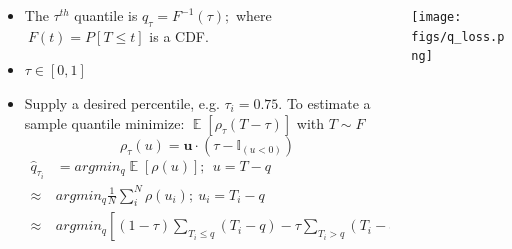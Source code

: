\documentclass[t, pdftex]{beamer}
\DeclareMathOperator*{\E}{\mathbb{E}}
\begin{document}
\begin{frame}
{\begin{columns}
\begin{column}{0.5\textwidth}
{\begin{itemize}
                    \item The $\tau^{th}$ quantile is $q_\tau = F^{-1}(\tau); $ where $\ F(t)=P[T \leq t]$ is a CDF.
                    \item $\tau \in [0, 1]$
                    \item Supply a desired percentile, e.g. $\tau_i = 0.75$.
                    To estimate a sample quantile minimize: $\E[\rho_\tau(T - \tau)]$ with $T \sim F$
                    \[
                    \rho_\tau( u) = \mathbf u \cdot (\tau - \mathbb{I}_{( u < 0)})
                    \]
                    \begin{equation}
                    \left.\begin{aligned}
                    \hat q_{\tau_i} &= argmin_{q} \E[\rho(u)];\ \  u = T - q  \\
                    \approx & argmin_q  \frac{1}{N} \sum_i^N \rho(u_i); \ u_i = T_i - q \\
                    \approx & argmin_q \left[ (1-\tau) \sum_{T_i \leq q}( T_i - q ) - \tau \sum_{T_i > q} (T_i - q) \right]
                    \end{aligned}\right. \nonumber
                    \end{equation}
                \end{itemize}
            }
        \end{column}
        \begin{column}{0.5\textwidth}  %
            \begin{center}
                \texttt{[image: figs/q\_loss.png]}
            \end{center}
        \end{column}
    \end{columns}
}
\end{frame}

\end{document}
